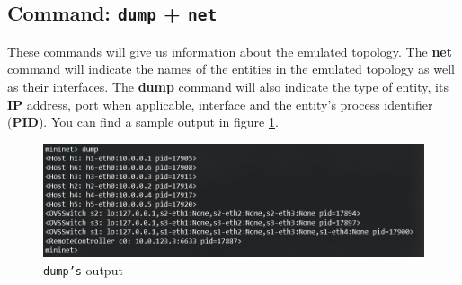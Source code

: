 \documentclass[12pt]{article}
\begin{document}
	\subsection{Command: \texttt{dump} + \texttt{net}}
		These commands will give us information about the emulated topology. The \textbf{net} command will indicate the names of the entities in the emulated topology as well as their interfaces. The \textbf{dump} command will also indicate the type of entity, its \textbf{IP} address, port when applicable, interface and the entity's process identifier (\textbf{PID}). You can find a sample output in figure \ref{f:dump}.

        \newpage
		\begin{figure}[!htb]
			\centering
			\includegraphics[width=\linewidth]{dump.png}
			\caption{\texttt{dump's} output}
			\label{f:dump}
		\end{figure}
\end{document}
